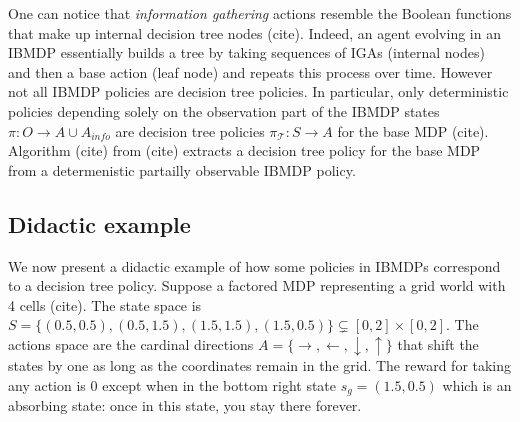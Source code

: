 One can notice that \textit{information gathering} actions resemble the Boolean functions that make up internal decision tree nodes (cite). 
Indeed, an agent evolving in an IBMDP essentially builds a tree by taking sequences of IGAs (internal nodes) and then a base action (leaf node) and repeats this process over time.
However not all IBMDP policies are decision tree policies. In particular, only deterministic policies depending solely on the observation part of the IBMDP states $\pi: O \rightarrow A\cup A_{info}$ are decision tree policies $\pi_{\mathcal{T}}: S \rightarrow A$ for the base MDP (cite).
Algorithm (cite) from (cite) extracts a decision tree policy for the base MDP from a determenistic partailly observable IBMDP policy.

\subsection{Didactic example}
We now present a didactic example of how some policies in IBMDPs correspond to a decision tree policy. 
Suppose a factored MDP representing a grid world with 4 cells (cite). The state space is $S = \{(0.5, 0.5), (0.5, 1.5), (1.5, 1.5), (1.5, 0.5)\}\subsetneq [0, 2] \times [0, 2]$.
The actions space are the cardinal directions $A = \{\rightarrow, \leftarrow, \downarrow, \uparrow\}$ that shift the states by one as long as the coordinates remain in the grid.
The reward for taking any action is 0 except when in the bottom right state $s_g = (1.5, 0.5)$ which is an absorbing state: once in this state, you stay there forever. 

